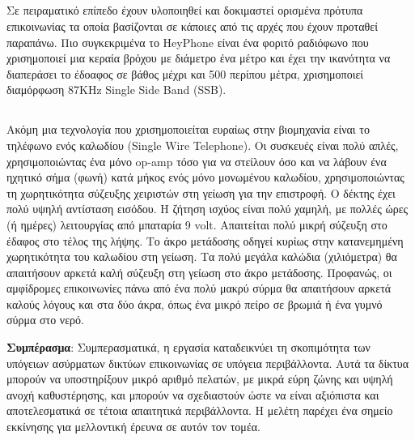 \documentclass[12pt]{article}
\begin{document}
\begin{multicols*}{2}
    \subsection{}
    Σε πειραματικό επίπεδο έχουν υλοποιηθεί και δοκιμαστεί ορισμένα πρότυπα επικοινωνίας
    τα οποία βασίζονται σε κάποιες από τις αρχές που έχουν προταθεί παραπάνω. Πιο
    συγκεκριμένα το HeyPhone είναι ένα φοριτό ραδιόφωνο που χρισημοποιεί μια κεραία βρόχου
    με διάμετρο ένα μέτρο και έχει την ικανότητα να διαπεράσει το έδοαφος σε βάθος μέχρι
    και 500 περίπου μέτρα, χρισημοποιεί διαμόρφωση 87KHz Single Side Band (SSB).

    \subsection{}
    Ακόμη μια τεχνολογία που χρισημοποιείται ευραίως στην βιομηχανία είναι το τηλέφωνο
    ενός καλωδίου (Single Wire Telephone). Οι συσκευές είναι πολύ απλές, χρησιμοποιώντας
    ένα μόνο op-amp τόσο για να στείλουν όσο και να λάβουν ένα ηχητικό σήμα (φωνή) κατά
    μήκος ενός μόνο μονωμένου καλωδίου, χρησιμοποιώντας τη χωρητικότητα σύζευξης χειριστών
    στη γείωση για την επιστροφή. Ο δέκτης έχει πολύ υψηλή αντίσταση εισόδου. Η ζήτηση
    ισχύος είναι πολύ χαμηλή, με πολλές ώρες (ή ημέρες) λειτουργίας από μπαταρία 9 volt.
    Απαιτείται πολύ μικρή σύζευξη στο έδαφος στο τέλος της λήψης. Το άκρο μετάδοσης οδηγεί
    κυρίως στην κατανεμημένη χωρητικότητα του καλωδίου στη γείωση. Τα πολύ μεγάλα καλώδια
    (χιλιόμετρα) θα απαιτήσουν αρκετά καλή σύζευξη στη γείωση στο άκρο μετάδοσης.
    Προφανώς, οι αμφίδρομες επικοινωνίες πάνω από ένα πολύ μακρύ σύρμα θα απαιτήσουν
    αρκετά καλούς λόγους και στα δύο άκρα, όπως ένα μικρό πείρο σε βρωμιά ή ένα γυμνό
    σύρμα στο νερό.

    \textbf{Συμπέρασμα}: Συμπερασματικά, η εργασία καταδεικνύει τη σκοπιμότητα των
    υπόγειων ασύρματων δικτύων επικοινωνίας σε υπόγεια περιβάλλοντα. Αυτά τα δίκτυα
    μπορούν να υποστηρίξουν μικρό αριθμό πελατών, με μικρά εύρη ζώνης και υψηλή ανοχή
    καθυστέρησης, και μπορούν να σχεδιαστούν ώστε να είναι αξιόπιστα και αποτελεσματικά σε
    τέτοια απαιτητικά περιβάλλοντα. Η μελέτη παρέχει ένα σημείο εκκίνησης για μελλοντική
    έρευνα σε αυτόν τον τομέα.

    \printbibliography
\end{multicols*}
\end{document}
